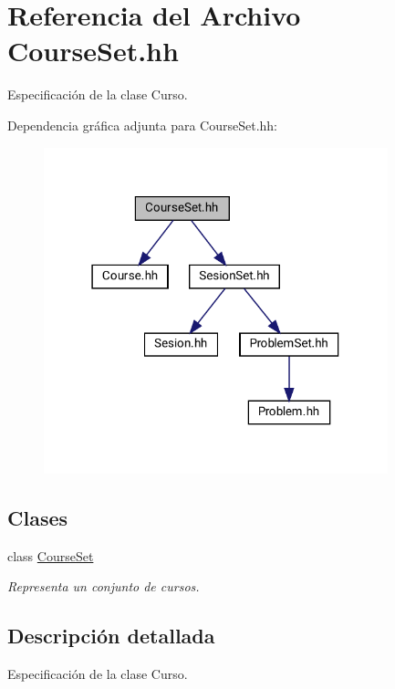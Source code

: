 \hypertarget{_course_set_8hh}{}\section{Referencia del Archivo Course\+Set.\+hh}
\label{_course_set_8hh}


Especificación de la clase Curso.  


Dependencia gráfica adjunta para Course\+Set.\+hh\+:\nopagebreak
\begin{figure}[H]
\begin{center}
\leavevmode
\includegraphics[width=283pt]{_course_set_8hh__incl}
\end{center}
\end{figure}
\subsection*{Clases}
\begin{DoxyCompactItemize}
\item 
class \mbox{\hyperlink{class_course_set}{Course\+Set}}
\begin{DoxyCompactList}\small\item\em Representa un conjunto de cursos. \end{DoxyCompactList}\end{DoxyCompactItemize}


\subsection{Descripción detallada}
Especificación de la clase Curso. 

